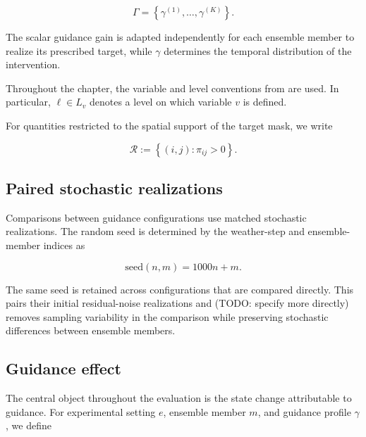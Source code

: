 \begin{equation}
    \Gamma
    =
    \left\{
        \gamma^{(1)},\ldots,\gamma^{(K)}
    \right\}.
    \label{eq:candidate-guidance-profiles}
\end{equation}

The scalar guidance gain is adapted independently for each ensemble member to
realize its prescribed target, while $\gamma$ determines the temporal
distribution of the intervention.

Throughout the chapter, the variable and level conventions from
 are used. In particular,
$\ell\in L_v$ denotes a level on which variable $v$ is defined.

For quantities restricted to the spatial support of the target mask, we write

\begin{equation}
    \mathcal{R}
    :=
    \left\{
        (i,j):\pi_{ij}>0
    \right\}.
    \label{eq:target-region}
\end{equation}


\subsection{Paired stochastic realizations}
\label{sec:experimental-seeding}

Comparisons between guidance configurations use matched stochastic
realizations. The random seed is determined by the weather-step and
ensemble-member indices as

\begin{equation}
    \mathrm{seed}(n,m)=1000n+m.
    \label{eq:experimental-seed}
\end{equation}

The same seed is retained across configurations that are compared directly.
This pairs their initial residual-noise realizations and (TODO: specify more directly) removes sampling
variability in the comparison while preserving stochastic differences between
ensemble members.


\subsection{Guidance effect}
\label{sec:guidance-effect}

The central object throughout the evaluation is the state change attributable
to guidance. For experimental setting $e$, ensemble member $m$, and guidance
profile $\gamma$, we define

